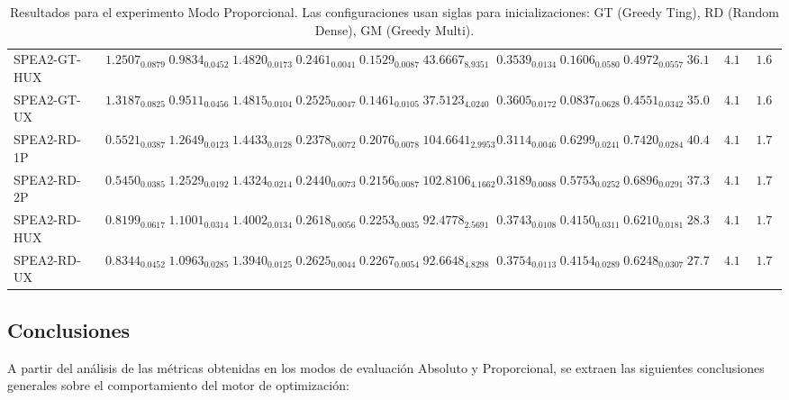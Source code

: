 \documentclass[11pt,a4paper]{article}
\begin{document}
\begin{table}[H]
{\begin{tabular}{lcccccccccccc}
SPEA2-GT-HUX & $1.2507_{0.0879}$ & $0.9834_{0.0452}$ & $1.4820_{0.0173}$ & $0.2461_{0.0041}$ & $0.1529_{0.0087}$ & $43.6667_{8.9351}$ & $0.3539_{0.0134}$ & $0.1606_{0.0580}$ & $0.4972_{0.0557}$ & $36.11$ & $4.11$ & $\mathbf{1.67}$ \\
SPEA2-GT-UX & $1.3187_{0.0825}$ & $0.9511_{0.0456}$ & $1.4815_{0.0104}$ & $0.2525_{0.0047}$ & $0.1461_{0.0105}$ & $37.5123_{4.0240}$ & $0.3605_{0.0172}$ & $0.0837_{0.0628}$ & $0.4551_{0.0342}$ & $35.00$ & $4.11$ & $\mathbf{1.67}$ \\
SPEA2-RD-1P & $0.5521_{0.0387}$ & $1.2649_{0.0123}$ & $1.4433_{0.0128}$ & $0.2378_{0.0072}$ & $0.2076_{0.0078}$ & $104.6641_{2.9953}$ & $0.3114_{0.0046}$ & $0.6299_{0.0241}$ & $0.7420_{0.0284}$ & $40.44$ & $4.11$ & $1.78$ \\
SPEA2-RD-2P & $0.5450_{0.0385}$ & $1.2529_{0.0192}$ & $1.4324_{0.0214}$ & $0.2440_{0.0073}$ & $0.2156_{0.0087}$ & $102.8106_{4.1662}$ & $0.3189_{0.0088}$ & $0.5753_{0.0252}$ & $0.6896_{0.0291}$ & $37.33$ & $4.11$ & $1.78$ \\
SPEA2-RD-HUX & $0.8199_{0.0617}$ & $1.1001_{0.0314}$ & $1.4002_{0.0134}$ & $0.2618_{0.0056}$ & $0.2253_{0.0035}$ & $92.4778_{2.5691}$ & $0.3743_{0.0108}$ & $0.4150_{0.0311}$ & $0.6210_{0.0181}$ & $28.33$ & $4.11$ & $1.78$ \\
SPEA2-RD-UX & $0.8344_{0.0452}$ & $1.0963_{0.0285}$ & $\mathbf{1.3940}_{0.0125}$ & $0.2625_{0.0044}$ & $0.2267_{0.0054}$ & $92.6648_{4.8298}$ & $0.3754_{0.0113}$ & $0.4154_{0.0289}$ & $0.6248_{0.0307}$ & $27.78$ & $4.11$ & $1.78$ \\
\end{tabular}
}
\caption{Resultados para el experimento Modo Proporcional. Las configuraciones usan siglas para inicializaciones: GT (Greedy Ting), RD (Random Dense), GM (Greedy Multi).}
\label{tab:exp_Modo Proporcional}
\end{table}

\clearpage

\subsection{Conclusiones}
A partir del análisis de las métricas obtenidas en los modos de evaluación Absoluto y Proporcional, se extraen las siguientes conclusiones generales sobre el comportamiento del motor de optimización:
\end{document}
